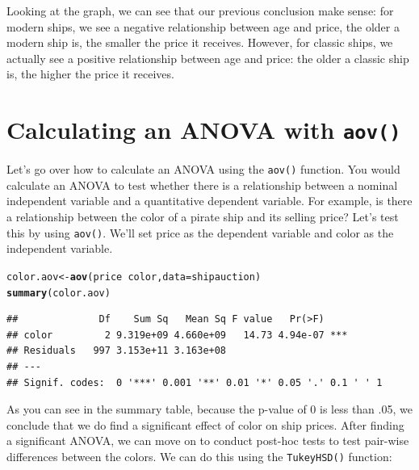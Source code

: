 \documentclass{tufte-book}\usepackage[]{graphicx}\usepackage[]{color}
\makeatletter
\newcommand{\hlopt}[1]{\textcolor[rgb]{0,0,0}{#1}}%
\newcommand{\hlstd}[1]{\textcolor[rgb]{0.345,0.345,0.345}{#1}}%
\newcommand{\hlkwb}[1]{\textcolor[rgb]{0.69,0.353,0.396}{#1}}%
\newcommand{\hlkwc}[1]{\textcolor[rgb]{0.333,0.667,0.333}{#1}}%
\newcommand{\hlkwd}[1]{\textcolor[rgb]{0.737,0.353,0.396}{\textbf{#1}}}%
\newenvironment{kframe}{%
 \def\at@end@of@kframe{}%
 \ifinner\ifhmode%
  \def\at@end@of@kframe{\end{minipage}}%
  \begin{minipage}{\columnwidth}%
 \fi\fi%
 \def\FrameCommand##1{\hskip\@totalleftmargin \hskip-\fboxsep
 \colorbox{shadecolor}{##1}\hskip-\fboxsep
     \hskip-\linewidth \hskip-\@totalleftmargin \hskip\columnwidth}%
 \MakeFramed {\advance\hsize-\width
   \@totalleftmargin\z@ \linewidth\hsize
   \@setminipage}}%
 {\par\unskip\endMakeFramed%
 \at@end@of@kframe}
\newenvironment{knitrout}{}{} %
\makeatother
\begin{document}
\begin{footnotesize}
\begin{marginfigure}
\begin{tiny}
\begin{knitrout}
\end{knitrout}
\end{tiny}
\end{marginfigure}

Looking at the graph, we can see that our previous conclusion make sense: for modern ships, we see a negative relationship between age and price, the older a modern ship is, the smaller the price it receives. However, for classic ships, we actually see a positive relationship between age and price: the older a classic ship is, the higher the price it receives.


\section{Calculating an ANOVA with \texttt{aov()}}

Let's go over how to calculate an ANOVA using the \texttt{aov()} function. You would calculate an ANOVA to test whether there is a relationship between a nominal independent variable and a quantitative dependent variable. For example, is there a relationship between the color of a pirate ship and its selling price? Let's test this by using \texttt{aov()}. We'll set price as the dependent variable and color as the independent variable.

\begin{knitrout}
\color{fgcolor}\begin{kframe}
\begin{alltt}
\hlstd{color.aov} \hlkwb{<-} \hlkwd{aov}\hlstd{(price} \hlopt{~} \hlstd{color,} \hlkwc{data} \hlstd{= shipauction)}
\hlkwd{summary}\hlstd{(color.aov)}
\end{alltt}
\begin{verbatim}
##              Df    Sum Sq   Mean Sq F value   Pr(>F)    
## color         2 9.319e+09 4.660e+09   14.73 4.94e-07 ***
## Residuals   997 3.153e+11 3.163e+08                     
## ---
## Signif. codes:  0 '***' 0.001 '**' 0.01 '*' 0.05 '.' 0.1 ' ' 1
\end{verbatim}
\end{kframe}
\end{knitrout}

As you can see in the summary table, because the p-value of 0 is less than .05, we conclude that we do find a significant effect of color on ship prices. After finding a significant ANOVA, we can move on to conduct post-hoc tests to test pair-wise differences between the colors. We can do this using the \texttt{TukeyHSD()} function:


\end{footnotesize}
\end{document}
